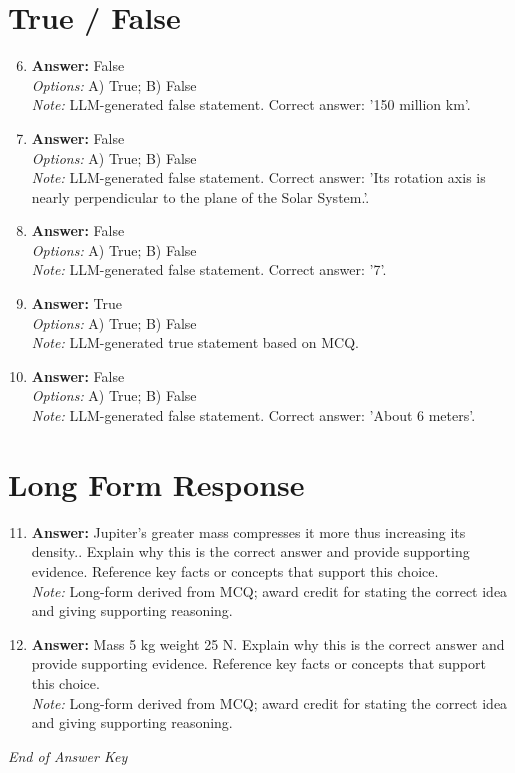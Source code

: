 \documentclass[12pt]{article}
\begin{document}
\section*{True / False}
\begin{enumerate}[label=\arabic*.]
\setcounter{enumi}{5}
\item \textbf{Answer:} False
\\ \textit{Options:} A) True; B) False
\\ \textit{Note:} LLM-generated false statement. Correct answer: '150 million km'.
\item \textbf{Answer:} False
\\ \textit{Options:} A) True; B) False
\\ \textit{Note:} LLM-generated false statement. Correct answer: 'Its rotation axis is nearly perpendicular to the plane of the Solar System.'.
\item \textbf{Answer:} False
\\ \textit{Options:} A) True; B) False
\\ \textit{Note:} LLM-generated false statement. Correct answer: '7'.
\item \textbf{Answer:} True
\\ \textit{Options:} A) True; B) False
\\ \textit{Note:} LLM-generated true statement based on MCQ.
\item \textbf{Answer:} False
\\ \textit{Options:} A) True; B) False
\\ \textit{Note:} LLM-generated false statement. Correct answer: 'About 6 meters'.
\end{enumerate}

\section*{Long Form Response}
\begin{enumerate}[label=\arabic*.]
\setcounter{enumi}{10}
\item \textbf{Answer:} Jupiter's greater mass compresses it more thus increasing its density.. Explain why this is the correct answer and provide supporting evidence. Reference key facts or concepts that support this choice.
\\ \textit{Note:} Long-form derived from MCQ; award credit for stating the correct idea and giving supporting reasoning.
\item \textbf{Answer:} Mass 5 kg weight 25 N. Explain why this is the correct answer and provide supporting evidence. Reference key facts or concepts that support this choice.
\\ \textit{Note:} Long-form derived from MCQ; award credit for stating the correct idea and giving supporting reasoning.
\end{enumerate}

\vfill
\noindent\textit{End of Answer Key}
\end{document}
